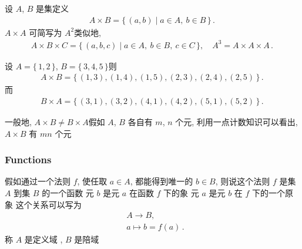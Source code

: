 \begin{definition}
    设 $A$, $B$ 是集\period 定义
    \begin{align*}
        A \times B = \{\, (a,b) \mid a \in A, \ b \in B  \,\} \period
    \end{align*}
    $A \times A$ 可简写为 $A^2$\period 类似地,
    \begin{align*}
        A \times B \times C = \{\, (a,b,c) \mid a \in A, \ b \in B, \ c \in C  \,\}, \quad A^3 = A \times A \times A \period
    \end{align*}
\end{definition}

\begin{example}
    设 $A = \{\, 1,2 \,\}$, $B = \{\, 3,4,5 \,\}$\period 则
    \begin{align*}
        A \times B = \{\, (1,3),(1,4),(1,5),(2,3),(2,4),(2,5) \,\}\period
    \end{align*}
    而
    \begin{align*}
        B \times A = \{\, (3,1),(3,2),(4,1),(4,2),(5,1),(5,2) \,\}\period
    \end{align*}
\end{example}

\begin{remark}
    一般地, $A \times B \neq B \times A$\period 假如 $A$, $B$ 各自有 $m$, $n$ 个元, 利用一点计数知识可以看出, $A \times B$ 有 $mn$ 个元\period
\end{remark}

\subsubsection*{Functions}

\begin{definition}
    假如通过一个法则 $f$, 使任取 $a \in A$, 都能得到唯一的 $b \in B$, 则说这个法则 $f$ 是集 $A$ 到集 $B$ 的一个函数 \period 元 $b$ 是元 $a$ 在函数 $f$ 下的象 \period 元 $a$ 是元 $b$ 在 $f$ 下的一个原象 \period 这个关系可以写为
    \begin{align*}
         & A \to B,  \tag*{$f$:}      \\
         & a \mapsto b = f(a) \period
    \end{align*}
    称 $A$ 是定义域 , $B$ 是陪域 \period
\end{definition}

